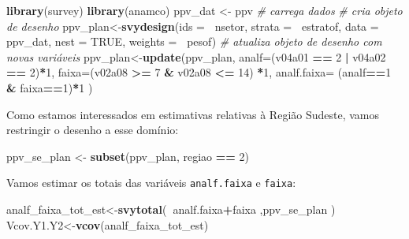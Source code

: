 \documentclass[]{book}
\newenvironment{Shaded}{\begin{snugshade}}{\end{snugshade}}
\newcommand{\KeywordTok}[1]{\textcolor[rgb]{0.13,0.29,0.53}{\textbf{#1}}}
\newcommand{\DataTypeTok}[1]{\textcolor[rgb]{0.13,0.29,0.53}{#1}}
\newcommand{\DecValTok}[1]{\textcolor[rgb]{0.00,0.00,0.81}{#1}}
\newcommand{\StringTok}[1]{\textcolor[rgb]{0.31,0.60,0.02}{#1}}
\newcommand{\CommentTok}[1]{\textcolor[rgb]{0.56,0.35,0.01}{\textit{#1}}}
\newcommand{\OtherTok}[1]{\textcolor[rgb]{0.56,0.35,0.01}{#1}}
\newcommand{\OperatorTok}[1]{\textcolor[rgb]{0.81,0.36,0.00}{\textbf{#1}}}
\newcommand{\NormalTok}[1]{#1}
\theoremstyle{definition}
\theoremstyle{definition}
\theoremstyle{definition}
\theoremstyle{remark}
\begin{document}
\begin{Shaded}
\begin{Highlighting}[]
\KeywordTok{library}\NormalTok{(survey)}
\KeywordTok{library}\NormalTok{(anamco) }
\NormalTok{ppv_dat <-}\StringTok{ }\NormalTok{ppv }\CommentTok{# carrega dados}
\CommentTok{# cria objeto de desenho}
\NormalTok{ppv_plan<-}\KeywordTok{svydesign}\NormalTok{(}\DataTypeTok{ids =} \OperatorTok{~}\NormalTok{nsetor, }\DataTypeTok{strata =} \OperatorTok{~}\NormalTok{estratof,}
\DataTypeTok{data =}\NormalTok{ ppv_dat, }\DataTypeTok{nest =} \OtherTok{TRUE}\NormalTok{, }\DataTypeTok{weights =} \OperatorTok{~}\NormalTok{pesof)}
\CommentTok{# atualiza objeto de desenho com novas variáveis}
\NormalTok{ppv_plan<-}\KeywordTok{update}\NormalTok{(ppv_plan,}
  \DataTypeTok{analf=}\NormalTok{(v04a01 }\OperatorTok{==}\StringTok{ }\DecValTok{2} \OperatorTok{|}\StringTok{ }\NormalTok{v04a02 }\OperatorTok{==}\StringTok{ }\DecValTok{2}\NormalTok{)}\OperatorTok{*}\DecValTok{1}\NormalTok{,}
  \DataTypeTok{faixa=}\NormalTok{(v02a08 }\OperatorTok{>=}\StringTok{ }\DecValTok{7} \OperatorTok{&}\StringTok{ }\NormalTok{v02a08 }\OperatorTok{<=}\StringTok{ }\DecValTok{14}\NormalTok{) }\OperatorTok{*}\DecValTok{1}\NormalTok{,}
  \DataTypeTok{analf.faixa=}\NormalTok{ (analf}\OperatorTok{==}\DecValTok{1} \OperatorTok{&}\StringTok{ }\NormalTok{faixa}\OperatorTok{==}\DecValTok{1}\NormalTok{)}\OperatorTok{*}\DecValTok{1}
\NormalTok{)}
\end{Highlighting}
\end{Shaded}

Como estamos interessados em estimativas relativas à Região Sudeste,
vamos restringir o desenho a esse domínio:

\begin{Shaded}
\begin{Highlighting}[]
\NormalTok{ppv_se_plan <-}\StringTok{ }\KeywordTok{subset}\NormalTok{(ppv_plan, regiao }\OperatorTok{==}\StringTok{ }\DecValTok{2}\NormalTok{)}
\end{Highlighting}
\end{Shaded}

Vamos estimar os totais das variáveis \texttt{analf.faixa} e
\texttt{faixa}:

\begin{Shaded}
\begin{Highlighting}[]
\NormalTok{analf_faixa_tot_est<-}\KeywordTok{svytotal}\NormalTok{(}\OperatorTok{~}\NormalTok{analf.faixa}\OperatorTok{+}\NormalTok{faixa ,ppv_se_plan )}
\NormalTok{Vcov.Y1.Y2<-}\KeywordTok{vcov}\NormalTok{(analf_faixa_tot_est) }
\end{Highlighting}
\end{Shaded}
\end{document}
